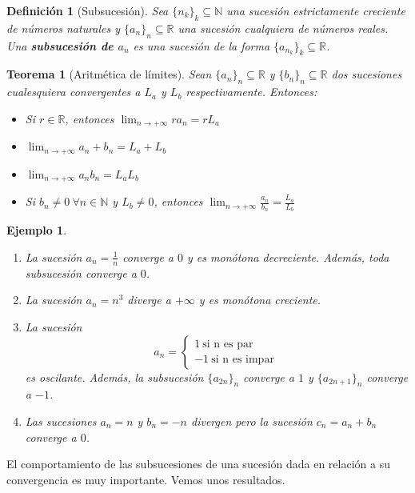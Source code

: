 \documentclass{article}
\newtheorem{theorem}{Teorema}
\newtheorem{define}{Definición}
\newtheorem{ejem}{Ejemplo}
\begin{document}
\begin{define}[Subsucesión]
	Sea $\{ n_k\}_k \subseteq \mathbb{N}$ una sucesión estrictamente creciente de números naturales y $\{ a_n\}_n \subseteq \mathbb{R}$ una sucesión cualquiera de números reales.
	Una \textbf{subsucesión de $a_n$} es una sucesión de la forma $\{ a_{n_k}\}_k \subseteq \mathbb{R}$.
\end{define}

\begin{theorem}[Aritmética de límites]
	Sean $\{ a_n\}_n \subseteq \mathbb{R}$ y $\{ b_n\}_n \subseteq \mathbb{R}$ dos sucesiones cualesquiera convergentes a $L_a$ y $L_b$ respectivamente. Entonces:
	\begin{itemize}
		\item
		Si $r \in \mathbb{R}$, entonces $\lim_{n\rightarrow +\infty} ra_n = rL_a$
		\item
		$\lim_{n\rightarrow +\infty} a_n + b_n = L_a + L_b$
		\item
		$\lim_{n\rightarrow +\infty} a_nb_n = L_aL_b$
		\item
		Si $b_n \neq 0\ \forall n \in \mathbb{N}$ y $L_b \not= 0$, entonces $\lim_{n\rightarrow +\infty} \frac{a_n}{b_n} = \frac{L_a}{L_b}$
	\end{itemize}
\end{theorem}


\begin{ejem}
\begin{enumerate}
\item
La sucesión $a_n = \frac{1}{n}$ converge a $0$ y es monótona decreciente. Además, toda subsucesión converge a $0$.
\item
La sucesión $a_n = n^3$ diverge a $+\infty$ y es monótona creciente.
\item
La sucesión 
\begin{equation}
a_n = \left\lbrace
\begin{array}{l}
1\ \text{si n es par}\\ 
-1\ \text{si n es impar}\
\end{array}
\right.
\end{equation}
es oscilante. Además, la subsucesión $\{a_{2n} \}_n$ converge a $1$ y $\{a_{2n+1} \}_n$ converge a $-1$.
\item
Las sucesiones $a_n = n$ y $b_n = -n$ divergen pero la sucesión $c_n = a_n + b_n$ converge a $0$.
\end{enumerate}
\end{ejem}

El comportamiento de las subsucesiones de una sucesión dada en relación a su convergencia es muy importante. Vemos unos resultados.
\end{document}
